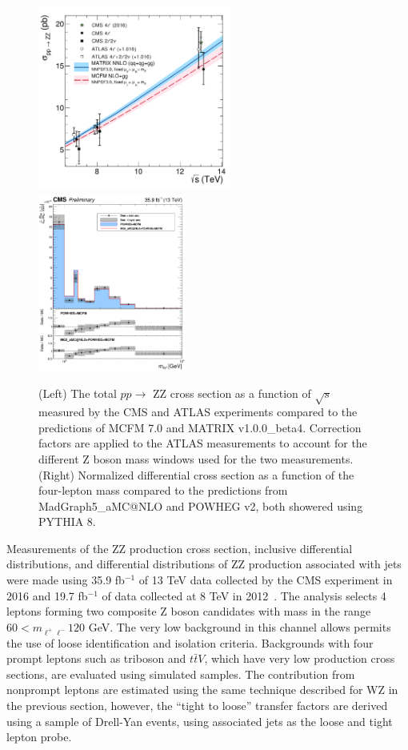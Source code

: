 \documentclass[10pt]{article}
\begin{document}
\begin{figure}[htb]
  \centering
    \includegraphics[height=2.4in]{figures/ZZCrossSection_vs_sqrtS.pdf}
    \includegraphics[height=2.3in]{figures/ZZ_13TeV_mZZ_unfolded.pdf}
    \caption{ (Left) The total $pp \rightarrow$ ZZ cross section
      as a function of $\sqrt{s}$ measured by the CMS and 
      ATLAS experiments compared to the predictions of MCFM 7.0 and MATRIX v1.0.0\_beta4. 
      Correction factors are applied to the ATLAS measurements to account
      for the different Z boson mass windows used for the two measurements.
      (Right) Normalized differential cross section as a function
      of the four-lepton mass compared to the predictions from
      MadGraph5\_aMC@NLO and POWHEG v2, both showered using PYTHIA 8.
      }
  \label{fig:ZZinclusive}
\end{figure}

Measurements of the ZZ production cross section, inclusive differential distributions,
and differential distributions of ZZ production associated with jets
were made using 35.9 fb$^{-1}$ of 13 TeV data collected by the CMS experiment in 2016
\cite{CMS:2017ruh}
\cite{CMS-PAS-SMP-16-019}
and 19.7 fb$^{-1}$ of data collected at 8 TeV in 2012~\cite{CMS-PAS-SMP-15-010}. 
The analysis selects 4 leptons forming two composite 
Z boson candidates with
mass in the range $60 < m_{\ell^{+}\ell^{-}} 120$ GeV. The very low background
in this channel allows permits the use of loose identification and isolation criteria. 
Backgrounds with four prompt leptons such as triboson and $t\bar{t}V$, 
which have very
low production cross sections, are evaluated using simulated samples. The 
contribution from nonprompt leptons are estimated using the same technique
described for WZ in the previous section, however, the ``tight to loose'' transfer 
factors are derived using a sample of Drell-Yan events, using associated 
jets as the loose and tight lepton probe.
\end{document}
